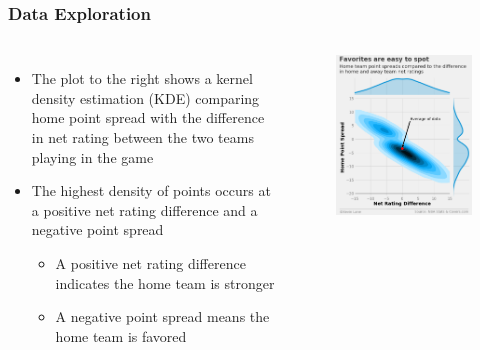 \documentclass{beamer}
\begin{document}
\begin{frame}
\frametitle{Data Exploration}
\begin{columns}
\begin{itemize}
    \item The plot to the right shows a kernel density estimation (KDE) comparing home point spread with the difference in net rating between the two teams playing in the game
    \item The highest density of points occurs at a positive net rating difference and a negative point spread
    \begin{itemize}
        \item A positive net rating difference indicates the home team is stronger
        \item A negative point spread means the home team is favored
    \end{itemize}
\end{itemize}
\begin{figure}
\includegraphics[scale=0.25]{../docs/assets/images/data-exploration/point-spread-kde.png}
\end{figure}
\end{columns}
\end{frame}
\end{document}
